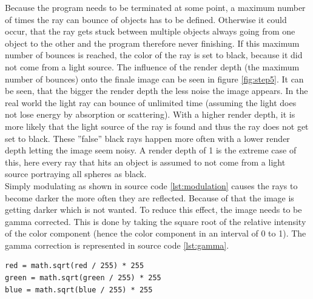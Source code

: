 \documentclass[12pt]{report}
\begin{document}
Because the program needs to be terminated at some point, a maximum number of times the ray can bounce of objects has to be defined. Otherwise it could occur, that the ray gets stuck between multiple objects always going from one object to the other and the program therefore never finishing. If this maximum number of bounces is reached, the color of the ray is set to black, because it did not come from a light source. The influence of the render depth (the maximum number of bounces) onto the finale image can be seen in figure \ref{fig:step5}. It can be seen, that the bigger the render depth the less noise the image appears. In the real world the light ray can bounce of unlimited time (assuming the light does not lose energy by absorption or scattering). With a higher render depth, it is more likely that the light source of the ray is found and thus the ray does not get set to black. These ''false'' black rays happen more often with a lower render depth letting the image seem noisy. A render depth of 1 is the extreme case of this, here every ray that hits an object is assumed to not come from a light source portraying all spheres as black. \\
Simply modulating as shown in source code \ref{lst:modulation} causes the rays to become darker the more often they are reflected. Because of that the image is getting darker which is not wanted. To reduce this effect, the image needs to be gamma corrected. This is done by taking the square root of the relative intensity of the color component (hence the color component in an interval of 0 to 1). The gamma correction is represented in source code \ref{lst:gamma}.
\begin{lstlisting}[caption={Gamma correction}, label=lst:gamma, style=mystyle]
red = math.sqrt(red / 255) * 255
green = math.sqrt(green / 255) * 255
blue = math.sqrt(blue / 255) * 255
\end{lstlisting}
\end{document}
